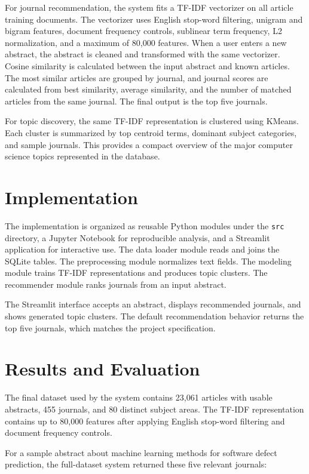 \documentclass[conference]{IEEEtran}
\begin{document}
For journal recommendation, the system fits a TF-IDF vectorizer on all article training documents. The vectorizer uses English stop-word filtering, unigram and bigram features, document frequency controls, sublinear term frequency, L2 normalization, and a maximum of 80,000 features. When a user enters a new abstract, the abstract is cleaned and transformed with the same vectorizer. Cosine similarity is calculated between the input abstract and known articles. The most similar articles are grouped by journal, and journal scores are calculated from best similarity, average similarity, and the number of matched articles from the same journal. The final output is the top five journals.

For topic discovery, the same TF-IDF representation is clustered using KMeans. Each cluster is summarized by top centroid terms, dominant subject categories, and sample journals. This provides a compact overview of the major computer science topics represented in the database.

\section{Implementation}
The implementation is organized as reusable Python modules under the \texttt{src} directory, a Jupyter Notebook for reproducible analysis, and a Streamlit application for interactive use. The data loader module reads and joins the SQLite tables. The preprocessing module normalizes text fields. The modeling module trains TF-IDF representations and produces topic clusters. The recommender module ranks journals from an input abstract.

The Streamlit interface accepts an abstract, displays recommended journals, and shows generated topic clusters. The default recommendation behavior returns the top five journals, which matches the project specification.

\section{Results and Evaluation}
The final dataset used by the system contains 23,061 articles with usable abstracts, 455 journals, and 80 distinct subject areas. The TF-IDF representation contains up to 80,000 features after applying English stop-word filtering and document frequency controls.

For a sample abstract about machine learning methods for software defect prediction, the full-dataset system returned these five relevant journals:
\end{document}
